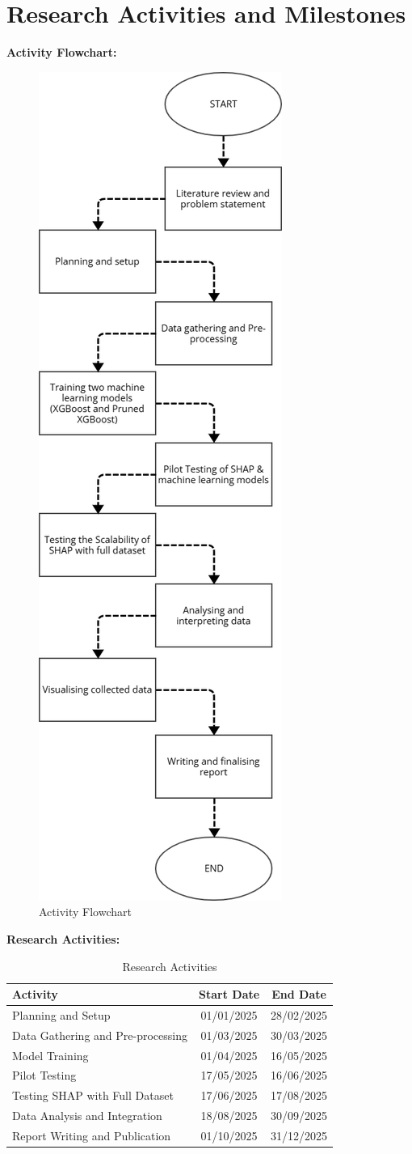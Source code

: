 \documentclass[12pt,a4paper]{article}
\begin{document}
\newpage

\section{Research Activities and Milestones}
\vspace{-1em}
\textbf{Activity Flowchart:} 
\begin{figure} [htbp]
    \centering
    \includegraphics[width=0.3\linewidth]{Activity Flowchart.png}
    \caption{Activity Flowchart}
    \label{Activity flowchart}
\end{figure}

\newpage

\textbf{Research Activities:}\\
\vspace{-2em}
\begin{table}[h]
    \centering
    \begin{tabular}{| l | c | c |}
    \hline
    \textbf{Activity} & \textbf{Start Date} & \textbf{End Date} \\
    \hline
    Planning and Setup & 01/01/2025 & 28/02/2025 \\
    \hline
    Data Gathering and Pre-processing & 01/03/2025 & 30/03/2025 \\
    \hline
    Model Training & 01/04/2025 & 16/05/2025 \\
    \hline
    Pilot Testing & 17/05/2025 & 16/06/2025 \\
    \hline
    Testing SHAP with Full Dataset & 17/06/2025 & 17/08/2025 \\
    \hline
    Data Analysis and Integration & 18/08/2025 & 30/09/2025 \\
    \hline
    Report Writing and Publication & 01/10/2025 & 31/12/2025 \\
    \hline
    \end{tabular}
    \caption{Research Activities}
    \label{Research Activities}
\end{table}
\end{document}
